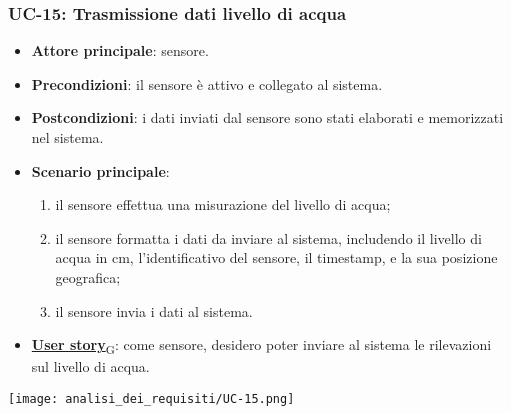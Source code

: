 \subsubsection{UC-15: Trasmissione dati livello di acqua}
\begin{itemize}
	\item \textbf{Attore principale}: sensore.
	\item \textbf{Precondizioni}: il sensore è attivo e collegato al sistema.
	\item \textbf{Postcondizioni}: i dati inviati dal sensore sono stati elaborati e memorizzati nel sistema.
	\item \textbf{Scenario principale}:
	      \begin{enumerate}
		      \item il sensore effettua una misurazione del livello di acqua;
		      \item il sensore formatta i dati da inviare al sistema, includendo il livello di acqua in cm, l'identificativo del sensore,
		            il timestamp, e la sua posizione geografica;
		      \item il sensore invia i dati al sistema.
	      \end{enumerate}
	\item \href{https://7last.github.io/docs/pb/documentazione-interna/glossario\#user-story}{\textbf{User story}\textsubscript{G}}: come sensore, desidero poter inviare al sistema le rilevazioni sul livello di acqua.
\end{itemize}

\begin{center}
	\texttt{[image: analisi\_dei\_requisiti/UC-15.png]}
\end{center}

